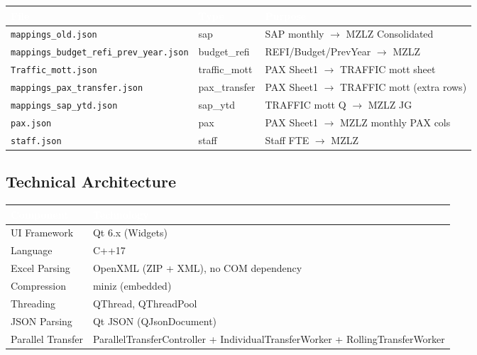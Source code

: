 \documentclass[11pt,a4paper]{article}
\begin{document}
\begin{center}
\begin{tabularx}{0.88\linewidth}{@{} l l X @{}}
\toprule
\rowcolor{PrimaryBlue}
\textcolor{White}{\textbf{File}} & \textcolor{White}{\textbf{Type}} & \textcolor{White}{\textbf{Purpose}} \\
\midrule
\texttt{mappings\_old.json}               & sap           & SAP monthly $\rightarrow$ MZLZ Consolidated \\
\texttt{mappings\_budget\_refi\_prev\_year.json} & budget\_refi & REFI/Budget/PrevYear $\rightarrow$ MZLZ \\
\texttt{Traffic\_mott.json}               & traffic\_mott & PAX Sheet1 $\rightarrow$ TRAFFIC mott sheet \\
\texttt{mappings\_pax\_transfer.json}     & pax\_transfer & PAX Sheet1 $\rightarrow$ TRAFFIC mott (extra rows) \\
\texttt{mappings\_sap\_ytd.json}          & sap\_ytd      & TRAFFIC mott Q $\rightarrow$ MZLZ JG \\
\texttt{pax.json}                         & pax           & PAX Sheet1 $\rightarrow$ MZLZ monthly PAX cols \\
\texttt{staff.json}                       & staff         & Staff FTE $\rightarrow$ MZLZ \\
\bottomrule
\end{tabularx}
\end{center}

\subsection{Technical Architecture}

\begin{center}
\begin{tabularx}{0.88\linewidth}{@{} l X @{}}
\toprule
\rowcolor{PrimaryBlue}
\textcolor{White}{\textbf{Component}} & \textcolor{White}{\textbf{Technology}} \\
\midrule
UI Framework          & Qt 6.x (Widgets) \\
Language              & C++17 \\
Excel Parsing         & OpenXML (ZIP + XML), no COM dependency \\
Compression           & miniz (embedded) \\
Threading             & QThread, QThreadPool \\
JSON Parsing          & Qt JSON (QJsonDocument) \\
Parallel Transfer     & ParallelTransferController + IndividualTransferWorker + RollingTransferWorker \\
\bottomrule
\end{tabularx}
\end{center}
\end{document}

